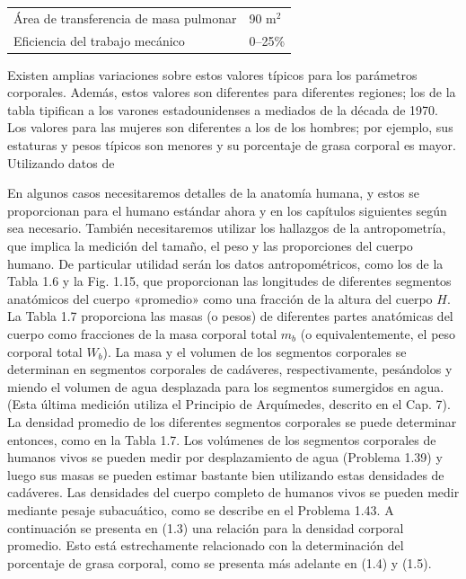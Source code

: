 \documentclass[12pt]{book}
\begin{document}
\begin{table}[htbp]
\begin{tabularx}{0.8\textwidth}{lX}
Área de transferencia de masa pulmonar & 90 $\text{m}^2$ \\
Eficiencia del trabajo mecánico & 0--25\% \\
\bottomrule
\end{tabularx}
\begin{flushleft}
    \small Existen amplias variaciones sobre estos valores típicos para los parámetros corporales. Además, estos valores son diferentes para diferentes regiones; los de la tabla tipifican a los varones estadounidenses a mediados de la década de 1970. Los valores para las mujeres son diferentes a los de los hombres; por ejemplo, sus estaturas y pesos típicos son menores y su porcentaje de grasa corporal es mayor. \\
    Utilizando datos de \cite{7, 41}
\end{flushleft}
\end{table}

En algunos casos necesitaremos detalles de la anatomía humana, y estos se proporcionan para el humano estándar ahora y en los capítulos siguientes según sea necesario. También necesitaremos utilizar los hallazgos de la antropometría, que implica la medición del tamaño, el peso y las proporciones del cuerpo humano. De particular utilidad serán los datos antropométricos, como los de la Tabla 1.6 y la Fig. 1.15, que proporcionan las longitudes de diferentes segmentos anatómicos del cuerpo «promedio» como una fracción de la altura del cuerpo $H$. La Tabla 1.7 proporciona las masas (o pesos) de diferentes partes anatómicas del cuerpo como fracciones de la masa corporal total $m_b$ (o equivalentemente, el peso corporal total $W_b$). La masa y el volumen de los segmentos corporales se determinan en segmentos corporales de cadáveres, respectivamente, pesándolos y miendo el volumen de agua desplazada para los segmentos sumergidos en agua. (Esta última medición utiliza el Principio de Arquímedes, descrito en el Cap. 7). La densidad promedio de los diferentes segmentos corporales se puede determinar entonces, como en la Tabla 1.7. Los volúmenes de los segmentos corporales de humanos vivos se pueden medir por desplazamiento de agua (Problema 1.39) y luego sus masas se pueden estimar bastante bien utilizando estas densidades de cadáveres. Las densidades del cuerpo completo de humanos vivos se pueden medir mediante pesaje subacuático, como se describe en el Problema 1.43. A continuación se presenta en (1.3) una relación para la densidad corporal promedio. Esto está estrechamente relacionado con la determinación del porcentaje de grasa corporal, como se presenta más adelante en (1.4) y (1.5).
\end{document}
